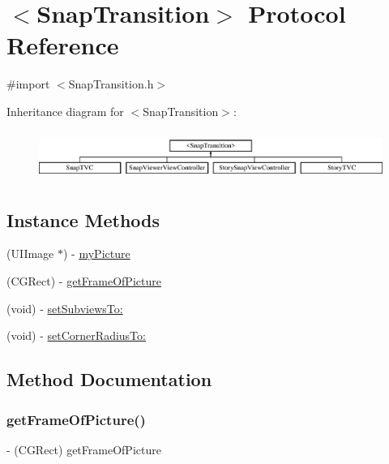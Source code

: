 \hypertarget{protocol_snap_transition-p}{}\section{$<$Snap\+Transition$>$ Protocol Reference}
\label{protocol_snap_transition-p}


{\ttfamily \#import $<$Snap\+Transition.\+h$>$}

Inheritance diagram for $<$Snap\+Transition$>$\+:\begin{figure}[H]
\begin{center}
\leavevmode
\includegraphics[height=1.618497cm]{protocol_snap_transition-p}
\end{center}
\end{figure}
\subsection*{Instance Methods}
\begin{DoxyCompactItemize}
\item 
(U\+I\+Image $\ast$) -\/ \hyperlink{protocol_snap_transition-p_aa6a9d9097c189c68f38c66c5a12fabf0}{my\+Picture}
\item 
(C\+G\+Rect) -\/ \hyperlink{protocol_snap_transition-p_adacb0f02393b7aedb967ce5e70699e52}{get\+Frame\+Of\+Picture}
\item 
(void) -\/ \hyperlink{protocol_snap_transition-p_aeedd9e588819333a4d22199deb0db01d}{set\+Subviews\+To\+:}
\item 
(void) -\/ \hyperlink{protocol_snap_transition-p_a24446e2ac371f496795947bb6ba6df1b}{set\+Corner\+Radius\+To\+:}
\end{DoxyCompactItemize}


\subsection{Method Documentation}
\hypertarget{protocol_snap_transition-p_adacb0f02393b7aedb967ce5e70699e52}{}\label{protocol_snap_transition-p_adacb0f02393b7aedb967ce5e70699e52} 
\subsubsection{\texorpdfstring{get\+Frame\+Of\+Picture()}{getFrameOfPicture()}}
{\footnotesize\ttfamily -\/ (C\+G\+Rect) get\+Frame\+Of\+Picture \begin{DoxyParamCaption}{ }\end{DoxyParamCaption}}

